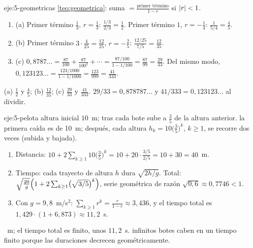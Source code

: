 \begin{solucion}{eje:5-geometricas}
\planteamiento \cref{teo:geometrica}: suma $=\frac{\text{primer término}}{1-r}$ si $\lvert r\rvert<1$.
\pasos
\begin{enumerate}[label=\arabic*.]
  \item (a) Primer término $\frac13$, $r=\frac13$: $\frac{1/3}{2/3}=\frac12$. Primer término $1$, $r=-\frac14$: $\frac{1}{5/4}=\frac45$.
  \item (b) Primer término $3\cdot\frac{4}{25}=\frac{12}{25}$, $r=-\frac25$: $\frac{12/25}{7/5}=\frac{12}{35}$.
  \item (c) $0{,}8787\ldots=\frac{87}{100}+\frac{87}{100^{2}}+\cdots=\frac{87/100}{1-1/100}=\frac{87}{99}=\frac{29}{33}$. Del mismo modo, $0{,}123123\ldots=\frac{123/1000}{1-1/1000}=\frac{123}{999}=\frac{41}{333}$.
\end{enumerate}
\resultado (a) $\frac12$ y $\frac45$; (b) $\frac{12}{35}$; (c) $\frac{29}{33}$ y $\frac{41}{333}$.
\comprobacion $29/33=0{,}878787\ldots$ y $41/333=0{,}123123\ldots$ al dividir.
\end{solucion}

\begin{solucion}{eje:5-pelota}
\datos altura inicial $10$~m; tras cada bote sube a $\frac35$ de la altura anterior.
\planteamiento la primera caída es de 10~m; después, cada altura $h_k=10\bigl(\frac35\bigr)^{k}$, $k\ge1$, se recorre dos veces (subida y bajada).
\pasos
\begin{enumerate}[label=\arabic*.]
  \item Distancia: $10+2\sum_{k\ge1}10\bigl(\frac35\bigr)^{k}=10+20\cdot\frac{3/5}{2/5}=10+30=40$~m.
  \item Tiempo: cada trayecto de altura $h$ dura $\sqrt{2h/g}$. Total: $\sqrt{\frac{20}{g}}\Bigl(1+2\sum_{k\ge1}\bigl(\sqrt{3/5}\bigr)^{k}\Bigr)$, serie geométrica de razón $\sqrt{0{,}6}\approx0{,}7746<1$.
  \item Con $g=9{,}8$~m/s$^{2}$: $\sum_{k\ge1}r^{k}=\frac{r}{1-r}\approx3{,}436$, y el tiempo total es $1{,}429\cdot(1+6{,}873)\approx11{,}2$~s.
\end{enumerate}
~m; el tiempo total es finito, unos $11{,}2$~s.
\comprobacion infinitos botes caben en un tiempo finito porque las duraciones decrecen geométricamente.
\end{solucion}

